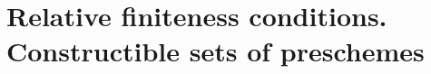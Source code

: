 \section{Relative finiteness conditions. Constructible sets of preschemes}
\label{section-relative-finiteness-conditions-constructible-sets-of-preschemes}

